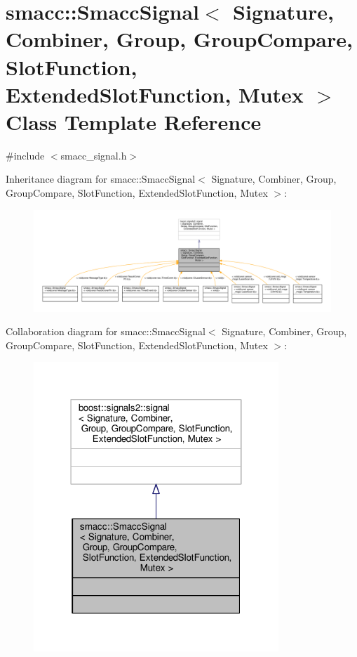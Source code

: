 \hypertarget{classsmacc_1_1SmaccSignal}{}\section{smacc\+:\+:Smacc\+Signal$<$ Signature, Combiner, Group, Group\+Compare, Slot\+Function, Extended\+Slot\+Function, Mutex $>$ Class Template Reference}
\label{classsmacc_1_1SmaccSignal}


{\ttfamily \#include $<$smacc\+\_\+signal.\+h$>$}



Inheritance diagram for smacc\+:\+:Smacc\+Signal$<$ Signature, Combiner, Group, Group\+Compare, Slot\+Function, Extended\+Slot\+Function, Mutex $>$\+:\nopagebreak
\begin{figure}[H]
\begin{center}
\leavevmode
\includegraphics[width=350pt]{classsmacc_1_1SmaccSignal__inherit__graph}
\end{center}
\end{figure}


Collaboration diagram for smacc\+:\+:Smacc\+Signal$<$ Signature, Combiner, Group, Group\+Compare, Slot\+Function, Extended\+Slot\+Function, Mutex $>$\+:\nopagebreak
\begin{figure}[H]
\begin{center}
\leavevmode
\includegraphics[width=262pt]{classsmacc_1_1SmaccSignal__coll__graph}
\end{center}
\end{figure}


